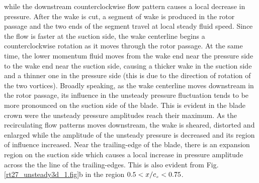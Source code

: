  while the downstream counterclockwise flow pattern causes a local decrease
 in pressure.
 After the wake is cut, a segment of wake is produced in the rotor passage and
 the two ends of the segment travel at local steady fluid speed. Since the flow
 is faster at the suction side, the wake centerline begins a counterclockwise
 rotation as it moves through the rotor passage.
 At the same time, the lower momentum fluid moves from the wake
 end near the pressure side to the wake end near the
 suction side, causing a thicker wake in the suction side and a thinner one in the
 pressure side (this is due to the direction of rotation of the two vortices).
 Broadly speaking, as the wake centerline moves downstream in the rotor passage,
 its influence in the unsteady pressure fluctuation tends to be
 more pronounced on the suction side of the blade. This is evident in
 the blade crown were the unsteady pressure amplitudes reach their maximum.
 As the recirculating flow patterns moves downstream, the wake is sheared,
 distorted and enlarged while the amplitude of the unsteady pressure
 is decreased and its region of influence increased.
 Near the trailing-edge of the blade, there is an expansion region
 on the suction side which causes a local increase in pressure amplitude
 across the the line of the trailing-edges. This is also evident from
 Fig. \ref{rt27_unsteady3d_1.fig}b in the region $0.5<x/c_{\mbox{\tiny $x$}}<0.75$.

